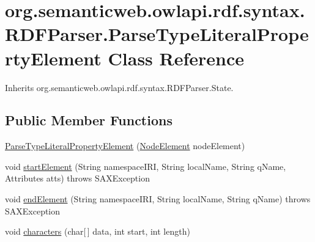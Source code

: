 \hypertarget{classorg_1_1semanticweb_1_1owlapi_1_1rdf_1_1syntax_1_1_r_d_f_parser_1_1_parse_type_literal_property_element}{\section{org.\-semanticweb.\-owlapi.\-rdf.\-syntax.\-R\-D\-F\-Parser.\-Parse\-Type\-Literal\-Property\-Element Class Reference}
\label{classorg_1_1semanticweb_1_1owlapi_1_1rdf_1_1syntax_1_1_r_d_f_parser_1_1_parse_type_literal_property_element}
}


Inherits org.\-semanticweb.\-owlapi.\-rdf.\-syntax.\-R\-D\-F\-Parser.\-State.

\subsection*{Public Member Functions}
\begin{DoxyCompactItemize}
\item 
\hyperlink{classorg_1_1semanticweb_1_1owlapi_1_1rdf_1_1syntax_1_1_r_d_f_parser_1_1_parse_type_literal_property_element_ae5958e0b975443f00d1a44291fd7e87d}{Parse\-Type\-Literal\-Property\-Element} (\hyperlink{classorg_1_1semanticweb_1_1owlapi_1_1rdf_1_1syntax_1_1_r_d_f_parser_1_1_node_element}{Node\-Element} node\-Element)
\item 
void \hyperlink{classorg_1_1semanticweb_1_1owlapi_1_1rdf_1_1syntax_1_1_r_d_f_parser_1_1_parse_type_literal_property_element_abf25e2593a81f0d9abbb742775bd1648}{start\-Element} (String namespace\-I\-R\-I, String local\-Name, String q\-Name, Attributes atts)  throws S\-A\-X\-Exception 
\item 
void \hyperlink{classorg_1_1semanticweb_1_1owlapi_1_1rdf_1_1syntax_1_1_r_d_f_parser_1_1_parse_type_literal_property_element_a43c6320c82b3b9283f60f447d7a0d3b1}{end\-Element} (String namespace\-I\-R\-I, String local\-Name, String q\-Name)  throws S\-A\-X\-Exception 
\item 
void \hyperlink{classorg_1_1semanticweb_1_1owlapi_1_1rdf_1_1syntax_1_1_r_d_f_parser_1_1_parse_type_literal_property_element_ad2b0b266f794be86563358476df68996}{characters} (char\mbox{[}$\,$\mbox{]} data, int start, int length)
\end{DoxyCompactItemize}

